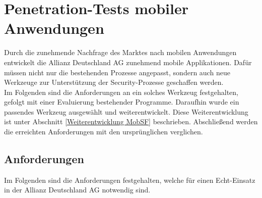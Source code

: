 \chapter{Penetration-Tests mobiler Anwendungen}
Durch die zunehmende Nachfrage des Marktes nach mobilen Anwendungen entwickelt die Allianz Deutschland AG zunehmend mobile Applikationen. Dafür müssen nicht nur die bestehenden Prozesse angepasst, sondern auch neue Werkzeuge zur Unterstützung der Security-Prozesse geschaffen werden.\\

Im Folgenden sind die Anforderungen an ein solches Werkzeug festgehalten, gefolgt mit einer Evaluierung bestehender Programme. Daraufhin wurde ein passendes Werkzeug ausgewählt und weiterentwickelt. Diese Weiterentwicklung ist unter Abschnitt \ref{Weiterentwicklung MobSF} beschrieben. Abschließend werden die erreichten Anforderungen mit den ursprünglichen verglichen.
\section{Anforderungen}\label{ref:PenMobAnwdWeiterAnford}
Im Folgenden sind die Anforderungen festgehalten, welche für einen Echt-Einsatz in der Allianz Deutschland AG notwendig sind.

